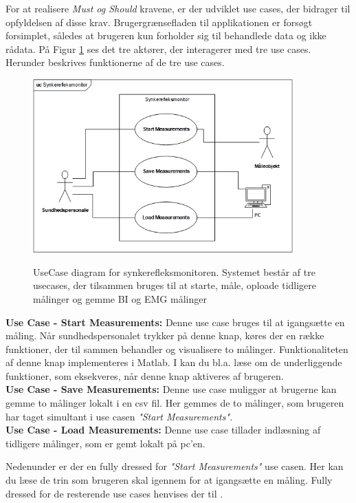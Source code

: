 \pagebreak
For at realisere \textit{Must og Should } kravene, er der udviklet use cases, der bidrager til opfyldelsen af disse krav. Brugergrænsefladen til applikationen er forsøgt forsimplet, således at brugeren kun forholder sig til behandlede data og ikke rådata. På Figur \ref{UseCaseV1} ses det tre aktører, der interagerer med tre use cases.  Herunder beskrives funktionerne af de tre use cases. 


\begin{figure}[H]
\centering
{\includegraphics[width=10cm]
{Figure/usecasediagram}}
\caption{UseCase diagram for synkerefleksmonitoren. Systemet består af tre usecases, der tilsammen bruges til at starte, måle, oploade tidligere målinger og gemme BI og EMG målinger}
\label{UseCaseV1}
\end{figure}

\textbf{Use Case - Start Measurements:}
Denne use case bruges til at igangsætte en måling. Når sundhedspersonalet trykker på denne knap, køres der en række funktioner, der til sammen behandler og visualisere to målinger. Funktionaliteten af denne knap implementeres i Matlab. I   kan du bl.a. læse om de underliggende funktioner, som eksekveres, når denne knap aktiveres af brugeren.\\

\textbf{Use Case - Save Measurements:}
Denne use case muliggør at brugerne kan gemme to målinger lokalt i en csv fil. Her gemmes de to målinger, som brugeren har taget simultant i use casen \textit{"Start Measurements".} \\
 
\textbf{Use Case - Load Measurements:} 
Denne use case tillader indlæsning af tidligere målinger, som er gemt lokalt på pc'en.  
 
 
 
 
 
 \pagebreak
Nedenunder er der en fully dressed for \textit{"Start Measurements"} use casen. Her kan du læse de trin som brugeren skal igennem for at igangsætte en måling. Fully dressed for de resterende use cases henvises der til . 

